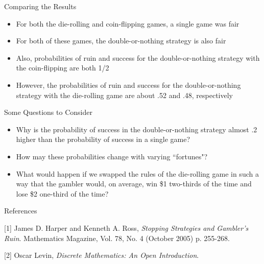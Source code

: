 \documentclass[14pt]{beamer}
\begin{document}
\begin{frame}{Comparing the Results}
 \begin{itemize}
     \item For both the die-rolling and coin-flipping games, a single game was fair
     \item For both of these games, the double-or-nothing strategy is also fair
     \item Also, probabilities of ruin and success for the double-or-nothing strategy with the coin-flipping are both 1/2
     \item However, the probabilities of ruin and success for the double-or-nothing strategy with the die-rolling game are about .52 and .48, respectively
 \end{itemize}
\end{frame}

\begin{frame}{Some Questions to Consider}
 \begin{itemize}
     \item Why is the probability of success in the double-or-nothing strategy almost .2 higher than the probability of success in a single game?
     \item How may these probabilities change with varying ``fortunes"?
     \item What would happen if we swapped the rules of the die-rolling game in such a way that the gambler would, on average, win \$1 two-thirds of the time and lose \$2 one-third of the time?
 \end{itemize}
\end{frame}

\begin{frame}{References}
\begin{thebibliography}{9}
[1] James D. Harper and Kenneth A. Ross, 
\textit{Stopping Strategies and Gambler's Ruin}.
Mathematics Magazine, Vol. 78, No. 4 (October 2005) p. 255-268.

[2] Oscar Levin, 
\textit{Discrete Mathematics: An Open Introduction}.
\end{thebibliography}
\end{frame}
\end{document}
